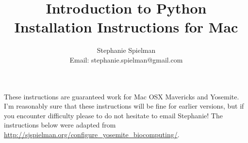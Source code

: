 \documentclass{article}
\begin{document}
\title{Introduction to Python \\ Installation Instructions for Mac}
\author{Stephanie Spielman \\ \footnotesize{Email: stephanie.spielman@gmail.com}}
\date{}
\maketitle{}

These instructions are guaranteed work for Mac OSX Mavericks and Yosemite. I'm reasonably sure that these instructions will be fine for earlier versions, but if you encounter difficulty please to do not hesitate to email Stephanie! The instructions below were adapted from \href{http://sjspielman.org/configure_yosemite_biocomputing/}
{http://sjspielman.org/configure\_yosemite\_biocomputing/}.
\end{document}
